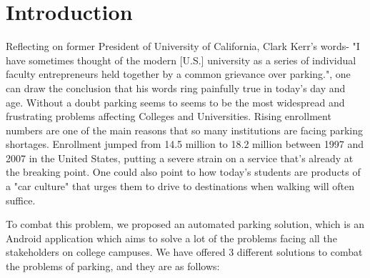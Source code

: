 \documentclass{acm_proc_article-sp}
\begin{document}





\section{Introduction}
Reflecting on former President of University of California, Clark Kerr's words-  "I have sometimes thought of the modern [U.S.] university as a series of individual faculty entrepreneurs held together by a common grievance over parking.", one can draw the conclusion that his words ring painfully true in today's day and age. Without a doubt parking seems to seems to be the most widespread and frustrating problems affecting Colleges and Universities. Rising enrollment numbers are one of the main reasons that so many institutions are facing parking shortages. Enrollment jumped from 14.5 million to 18.2 million between 1997 and 2007 in the United States, putting a severe strain on a service that's already at the breaking point. One could also point to how today's students are products of a "car culture" that urges them to drive to destinations when walking will often suffice. 

To combat this problem, we proposed an automated parking solution, which is an Android application which aims to solve a lot of the problems facing all the stakeholders on college campuses. We have offered 3 different solutions to combat the problems of parking, and they are as follows:
\end{document}
